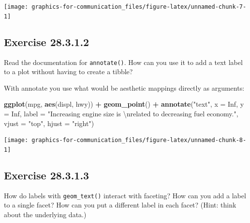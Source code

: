 \documentclass[]{book}
\newenvironment{Shaded}{\begin{snugshade}}{\end{snugshade}}
\newcommand{\CharTok}[1]{\textcolor[rgb]{0.31,0.60,0.02}{#1}}
\newcommand{\DataTypeTok}[1]{\textcolor[rgb]{0.13,0.29,0.53}{#1}}
\newcommand{\KeywordTok}[1]{\textcolor[rgb]{0.13,0.29,0.53}{\textbf{#1}}}
\newcommand{\NormalTok}[1]{#1}
\newcommand{\OperatorTok}[1]{\textcolor[rgb]{0.81,0.36,0.00}{\textbf{#1}}}
\newcommand{\OtherTok}[1]{\textcolor[rgb]{0.56,0.35,0.01}{#1}}
\newcommand{\StringTok}[1]{\textcolor[rgb]{0.31,0.60,0.02}{#1}}
\theoremstyle{plain}
\theoremstyle{remark}
\begin{document}
\begin{center}\texttt{[image: graphics-for-communication\_files/figure-latex/unnamed-chunk-7-1]} \end{center}

\hypertarget{exercise-28.3.1.2}{%
\subsection*{\texorpdfstring{Exercise {28.3.1.2}}{Exercise 28.3.1.2}}\label{exercise-28.3.1.2}}

Read the documentation for \texttt{annotate()}. How can you use it to add a text label to a plot without having to create a tibble?

With annotate you use what would be aesthetic mappings directly as arguments:

\begin{Shaded}
\begin{Highlighting}[]
\KeywordTok{ggplot}\NormalTok{(mpg, }\KeywordTok{aes}\NormalTok{(displ, hwy)) }\OperatorTok{+}
\StringTok{  }\KeywordTok{geom_point}\NormalTok{() }\OperatorTok{+}
\StringTok{  }\KeywordTok{annotate}\NormalTok{(}\StringTok{"text"}\NormalTok{, }\DataTypeTok{x =} \OtherTok{Inf}\NormalTok{, }\DataTypeTok{y =} \OtherTok{Inf}\NormalTok{,}
           \DataTypeTok{label =} \StringTok{"Increasing engine size is }\CharTok{\textbackslash{}n}\StringTok{related to decreasing fuel economy."}\NormalTok{, }\DataTypeTok{vjust =} \StringTok{"top"}\NormalTok{, }\DataTypeTok{hjust =} \StringTok{"right"}\NormalTok{)}
\end{Highlighting}
\end{Shaded}

\begin{center}\texttt{[image: graphics-for-communication\_files/figure-latex/unnamed-chunk-8-1]} \end{center}

\hypertarget{exercise-28.3.1.3}{%
\subsection*{\texorpdfstring{Exercise {28.3.1.3}}{Exercise 28.3.1.3}}\label{exercise-28.3.1.3}}

How do labels with \texttt{geom\_text()} interact with faceting?
How can you add a label to a single facet?
How can you put a different label in each facet?
(Hint: think about the underlying data.)
\end{document}
